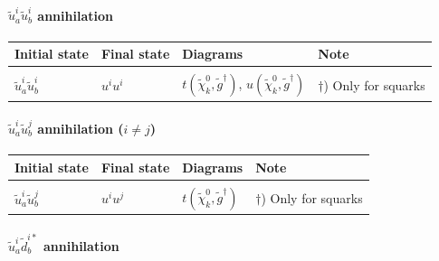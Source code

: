 \documentclass[a4paper,10pt,oneside]{book}
\newcommand{\tabspace}{\\[-2.5ex]}
\begin{document}
\paragraph{$\tilde{u}^i_a \tilde{u}^{i}_b$ annihilation}

\begin{center}
\begin{tabular}{llll} \hline
{\bfseries Initial state} & {\bfseries Final state} &
{\bfseries Diagrams} & {\bfseries Note} \\ \hline \tabspace
$\tilde{u}^i_a\tilde{u}^{i}_b$ & $u^i u^i$ &
$t(\tilde{\chi}_{k}^0,\tilde{g}^\dagger)$, $u(\tilde{\chi}_{k}^0,\tilde{g}^\dagger)$ 
& $\dagger$) Only for squarks \\ \hline
\end{tabular}
\end{center}

\paragraph{$\tilde{u}^i_a \tilde{u}^{j}_b$ annihilation ($i \ne j$)}

\begin{center}
\begin{tabular}{llll} \hline
{\bfseries Initial state} & {\bfseries Final state} &
{\bfseries Diagrams} & {\bfseries Note} \\ \hline \tabspace
$\tilde{u}^i_a \tilde{u}^{j}_b$ & $u^i u^j$ &
$t(\tilde{\chi}_{k}^0,\tilde{g}^\dagger)$
& $\dagger$) Only for squarks \\ \hline
\end{tabular}
\end{center}

\paragraph{$\tilde{u}^i_a \tilde{d}_{b}^{i*}$ annihilation}
\end{document}
